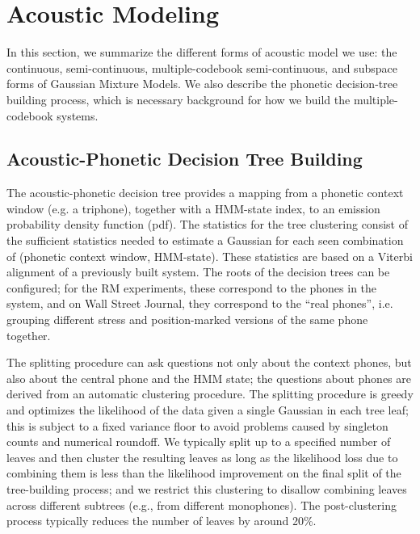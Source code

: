 \documentclass{article}
\begin{document}


\section{Acoustic Modeling}
\label{sec:am}
In this section, we summarize the different forms of acoustic model we use: 
the continuous, semi-continuous, multiple-codebook semi-continuous, and 
subspace forms of Gaussian Mixture Models. 
We also describe the phonetic decision-tree building process, which is 
necessary background for how we build the multiple-codebook systems.

\subsection{Acoustic-Phonetic Decision Tree Building}
The acoustic-phonetic decision tree provides a mapping from
a phonetic context window (e.g. a triphone), together with a HMM-state index, 
to an emission probability density function (pdf). 
%
The statistics for the tree clustering consist of the 
sufficient statistics needed to estimate a Gaussian for each seen combination 
of (phonetic context window, HMM-state).  These statistics are based on a Viterbi 
alignment of a previously built system.  The roots
of the decision trees can be configured; for the RM experiments, these correspond to
the phones in the system, and on Wall Street Journal, they
correspond to the ``real phones'', i.e. grouping different stress and
position-marked versions of the same phone together.  

The splitting procedure can ask questions not only about the context phones,
but also about the central phone and the HMM state; the questions about phones are 
derived from an automatic clustering procedure.  The splitting procedure is
greedy and optimizes the likelihood of the data given a single Gaussian in each
tree leaf; this is subject to a fixed variance floor to avoid problems caused
by singleton counts and numerical roundoff.  We typically split up to a 
specified number of leaves and then cluster the resulting leaves as long as the
likelihood loss due to combining them is less than the likelihood improvement
on the final split of the tree-building process; and we restrict this 
clustering to disallow combining leaves across different subtrees (e.g., from 
different monophones).  The post-clustering process typically reduces the number 
of leaves by around 20\%.
\end{document}
